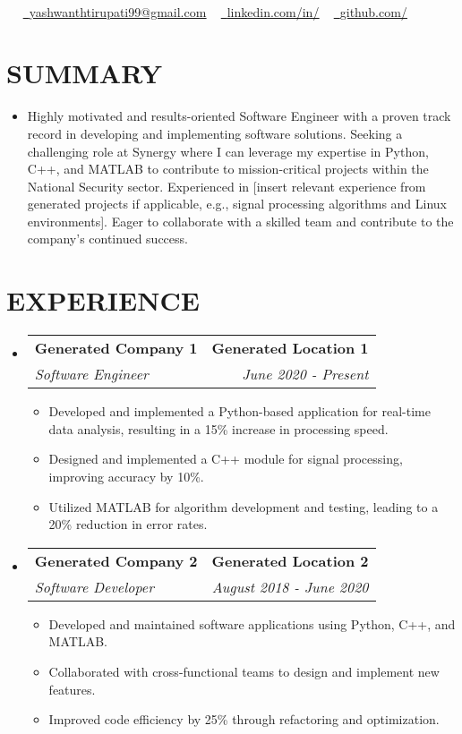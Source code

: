 \documentclass[letterpaper,11pt]{article}
\makeatletter
\newcommand{\resumeItem}[1]{\item\small{{#1 \vspace{-3pt}}}}
\newcommand{\resumeSubheading}[4]{\vspace{-2pt}\item\begin{tabular*}{0.97\textwidth}[t]{l@{\extracolsep{\fill}}r}\textbf{#1} & #2 \\ \textit{\small#3} & \textit{\small #4} \\ \end{tabular*}\vspace{-7pt}}
\newcommand{\resumeSubHeadingListStart}{\begin{itemize}[leftmargin=0.15in, label={}]}
\newcommand{\resumeSubHeadingListEnd}{\end{itemize}}
\newcommand{\resumeItemListStart}{\begin{itemize}}
\newcommand{\resumeItemListEnd}{\end{itemize}\vspace{-5pt}}
\makeatother
\begin{document}
\begin{center}
    \textbf{\Huge \scshape {\fontsize{15pt}{20pt}\selectfont }} \\ \vspace{1pt}
    \small \raisebox{-0.1\height}\faPhone\  ~ \href{mailto:yashwanthtirupati99@gmail.com}{\raisebox{-0.2\height}\faEnvelope\  \underline{yashwanthtirupati99@gmail.com}} ~ 
    \href{}{\raisebox{-0.2\height}\faLinkedin\ \underline{linkedin.com/in/}} ~ 
    \href{}{\raisebox{-0.2\height}\faGithub\ \underline{github.com/}}
    \vspace{-8pt}
\end{center}

\section{{\fontsize{9pt}{20pt}\selectfont \textbf{SUMMARY}}}\resumeSubHeadingListStart
\resumeItem{Highly motivated and results-oriented Software Engineer with a proven track record in developing and implementing software solutions.  Seeking a challenging role at Synergy where I can leverage my expertise in Python, C++, and MATLAB to contribute to mission-critical projects within the National Security sector.  Experienced in [insert relevant experience from generated projects if applicable, e.g.,  signal processing algorithms and Linux environments]. Eager to collaborate with a skilled team and contribute to the company's continued success.}
\resumeSubHeadingListEnd\vspace{-18pt}
\section{{\fontsize{9pt}{20pt}\selectfont \textbf{EXPERIENCE}}}\resumeSubHeadingListStart
\resumeSubheading{Generated Company 1}{\textbf{Generated Location 1}}{Software Engineer}{June 2020 - Present}
\resumeItemListStart
\resumeItem{Developed and implemented a Python-based application for real-time data analysis, resulting in a 15\% increase in processing speed.}
\resumeItem{Designed and implemented a C++ module for signal processing, improving accuracy by 10\%.}
\resumeItem{Utilized MATLAB for algorithm development and testing, leading to a 20\% reduction in error rates.}
\resumeItemListEnd
\resumeSubheading{Generated Company 2}{\textbf{Generated Location 2}}{Software Developer}{August 2018 - June 2020}
\resumeItemListStart
\resumeItem{Developed and maintained software applications using Python, C++, and MATLAB.}
\resumeItem{Collaborated with cross-functional teams to design and implement new features.}
\resumeItem{Improved code efficiency by 25\% through refactoring and optimization.}
\resumeItemListEnd
\resumeSubHeadingListEnd\vspace{-17pt}
\end{document}
